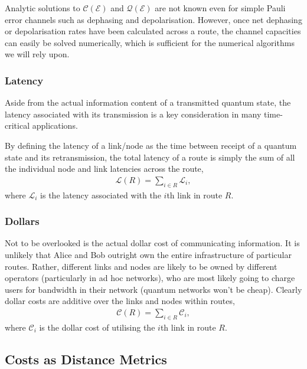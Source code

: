 \documentclass[aps,rmp,twocolumn,amsmath,amssymb,nofootinbib,superscriptaddress]{revtex4}
\begin{document}
Analytic solutions to $\mathcal{C}(\mathcal{E})$ and $\mathcal{Q}(\mathcal{E})$ are not known even for simple Pauli error channels such as dephasing and depolarisation. However, once net dephasing or depolarisation rates have been calculated across a route, the channel capacities can easily be solved numerically, which is sufficient for the numerical algorithms we will rely upon.

%
%

\subsubsection{Latency} \label{sec:latency_metric}

Aside from the actual information content of a transmitted quantum state, the latency associated with its transmission is a key consideration in many time-critical applications.

By defining the latency of a link/node as the time between receipt of a quantum state and its retransmission, the total latency of a route is simply the sum of all the individual node and link latencies across the route,
\begin{align}
\mathcal{L}(R) = \sum_{i\in R} \mathcal{L}_i,
\end{align}
where $\mathcal{L}_i$ is the latency associated with the $i$th link in route $R$.

%
%

\subsubsection{Dollars} \label{sec:dollars}

Not to be overlooked is the actual dollar cost of communicating information. It is unlikely that Alice and Bob outright own the entire infrastructure of particular routes. Rather, different links and nodes are likely to be owned by different operators (particularly in ad hoc networks), who are most likely going to charge users for bandwidth in their network (quantum networks won't be cheap). Clearly dollar costs are additive over the links and nodes within routes,
\begin{align}
\mathcal{C}(R) = \sum_{i\in R} \mathcal{C}_i,
\end{align}
where $\mathcal{C}_i$ is the dollar cost of utilising the $i$th link in route $R$.

%
%

\subsection{Costs as Distance Metrics} \label{sec:cost_as_dist}
\end{document}
